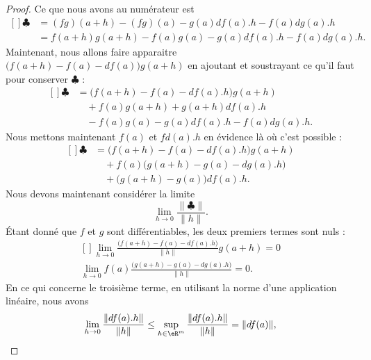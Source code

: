 \begin{proof}
	Ce que nous avons au numérateur est
	\begin{equation}
		\begin{aligned}[]
			\clubsuit & =(fg)(a+h)-(fg)(a)-g(a)df(a).h-f(a)dg(a).h      \\
			          & =f(a+h)g(a+h)-f(a)g(a)-g(a)df(a).h-f(a)dg(a).h.
		\end{aligned}
	\end{equation}
	Maintenant, nous allons faire apparaitre $\big( f(a+h)-f(a)-df(a) \big)g(a+h)$ en ajoutant et soustrayant ce qu'il faut pour conserver $\clubsuit$ :
	\begin{equation}
		\begin{aligned}[]
			\clubsuit & =\big( f(a+h)-f(a)-df(a).h \big)g(a+h)   \\
			          & \quad +f(a)g(a+h)+g(a+h)df(a).h          \\
			          & \quad -f(a)g(a)-g(a)df(a).h-f(a)dg(a).h.
		\end{aligned}
	\end{equation}
	Nous mettons maintenant $f(a)$ et $fd(a).h$ en évidence là où c'est possible :
	\begin{equation}
		\begin{aligned}[]
			\clubsuit & =\big( f(a+h)-f(a)-df(a).h \big)g(a+h)    \\
			          & \quad+f(a)\big( g(a+h)-g(a)-dg(a).h \big) \\
			          & \quad+\big( g(a+h)-g(a) \big)df(a).h.
		\end{aligned}
	\end{equation}
	Nous devons maintenant considérer la limite
	\begin{equation}
		\lim_{h\to 0}\frac{ \| \clubsuit \| }{ \| h \| }.
	\end{equation}
	Étant donné que $f$ et $g$ sont différentiables, les deux premiers termes sont nuls :
	\begin{equation}
		\begin{aligned}[]
			\lim_{h\to 0}\frac{ \big( f(a+h)-f(a)-df(a).h \big)}{\| h \|}g(a+h)=0 \\
			\lim_{h\to 0} f(a)\frac{ \big( g(a+h)-g(a)-dg(a).h \big)}{\| h \|}=0.
		\end{aligned}
	\end{equation}
	En ce qui concerne le troisième terme, en utilisant la norme d'une application linéaire, nous avons
	\begin{equation}
		\lim_{h\to 0} \frac{ \| df(a).h \| }{ \| h \| }\leq\sup_{h\in\eR^m}\frac{ \| df(a).h \| }{ \| h \| }=\| df(a) \|,

\end{equation}
\end{proof}

